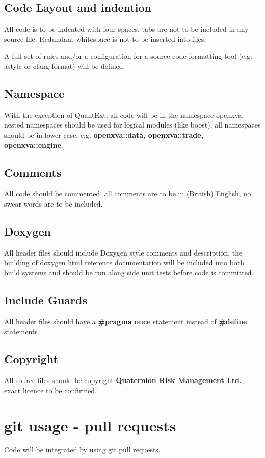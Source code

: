 \documentclass[12pt, a4paper]{article}
\begin{document}
\subsection*{Code Layout and indention}
All code is to be indented with four spaces, tabs are not to be included in any source file. Redundant whitespace is not to be inserted into files. 

\noindent
A full set of rules and/or a configuration for a source code formatting tool (e.g. astyle or clang-format) will be defined.

\subsection*{Namespace}
With the exception of QuantExt, all code will be in the namespace openxva, nested namespaces should be used for logical modules (like boost), all namespaces should be in lower case, e.g. \textbf{openxva::data, openxva::trade, openxva::engine}.

\subsection*{Comments}
All code should be commented, all comments are to be in (British) English, no swear words are to be included.

\subsection*{Doxygen}
All header files should include Doxygen style comments and description, the building of doxygen html reference documentation will be included into both build systems and should be run along side unit tests before code is committed.

\subsection*{Include Guards}
All header files should have a \textbf{\#pragma once} statement instead of \textbf{\#define} statements

\subsection*{Copyright}
All source files should be copyright \textbf{Quaternion Risk Management Ltd.}, exact licence to be confirmed.

\section*{git usage - pull requests}
Code will be integrated by using git pull requests.
\end{document}
